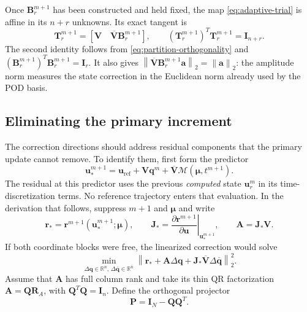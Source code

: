 \documentclass[11pt]{article}
\newcommand{\q}{\mathbf q}
\newcommand{\qbar}{\overline{\mathbf q}}
\newcommand{\uvec}{\mathbf u}
\newcommand{\mub}{\bm\mu}
\newcommand{\norm}[1]{\left\lVert #1 \right\rVert}
\begin{document}
Once $\mathbf B_r^{m+1}$ has been constructed and held fixed, the map
\eqref{eq:adaptive-trial} is affine in its $n+r$ unknowns.  Its exact tangent
is
\begin{equation}
\mathbf T_r^{m+1}=\left[\mathbf V\quad
\overline{\mathbf V}\mathbf B_r^{m+1}\right],\qquad
(\mathbf T_r^{m+1})^T\mathbf T_r^{m+1}=\mathbf I_{n+r}.
\label{eq:adaptive-tangent}
\end{equation}
The second identity follows from \eqref{eq:partition-orthogonality} and
$(\mathbf B_r^{m+1})^T\mathbf B_r^{m+1}=\mathbf I_r$.  It also gives
$\norm{\overline{\mathbf V}\mathbf B_r^{m+1}\mathbf a}_2
=\norm{\mathbf a}_2$: the amplitude norm measures the state correction in
the Euclidean norm already used by the POD basis.

\subsection{Eliminating the primary increment}
The correction directions should address residual components that the
primary update cannot remove.  To identify them, first form the predictor
\begin{equation}
\uvec_*^{m+1}=\uvec_{\mathrm{ref}}+\mathbf V\q^m+
\overline{\mathbf V}\mathcal M(\mub,t^{m+1}).
\label{eq:adaptive-predictor}
\end{equation}
The residual at this predictor uses the previous \emph{computed} state
$\uvec_r^m$ in its time-discretization terms.  No reference trajectory enters
that evaluation.  In the derivation that follows, suppress $m+1$ and
$\mub$ and write
\begin{equation}
\mathbf r_* = \mathbf r^{m+1}(\uvec_*^{m+1};\mub),\qquad
\mathbf J_* = \left.\frac{\partial\mathbf r^{m+1}}{\partial\uvec}
\right|_{\uvec_*^{m+1}},\qquad \mathbf A=\mathbf J_*\mathbf V.
\label{eq:adaptive-linearization}
\end{equation}
If both coordinate blocks were free, the linearized correction would solve
\begin{equation}
\min_{\Delta\q\in\mathbb R^n,\,\Delta\qbar\in\mathbb R^{\bar n}}
\norm{\mathbf r_*+\mathbf A\Delta\q+
\mathbf J_*\overline{\mathbf V}\Delta\qbar}_2^2.
\label{eq:adaptive-full-linearized}
\end{equation}
Assume that $\mathbf A$ has full column rank and take its thin QR
factorization $\mathbf A=\mathbf Q\mathbf R_A$, with
$\mathbf Q^T\mathbf Q=\mathbf I_n$.  Define the orthogonal projector
\begin{equation}
\mathbf P=\mathbf I_N-\mathbf Q\mathbf Q^T.
\label{eq:adaptive-projector}
\end{equation}
\end{document}
